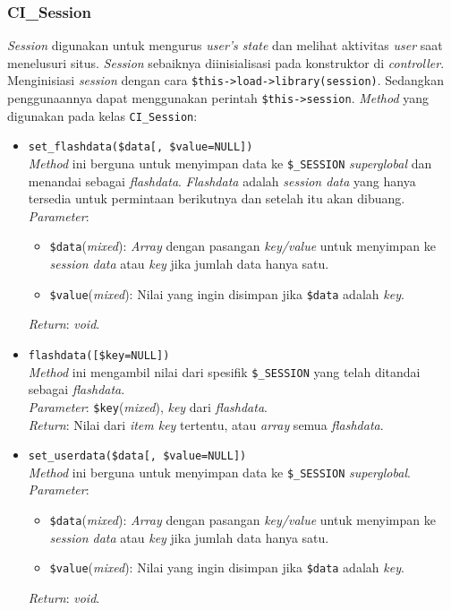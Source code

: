 \subsubsection{CI\_Session}
\textit{Session} digunakan untuk mengurus  \textit{user's state} dan melihat aktivitas \textit{user} saat menelusuri situs. \textit{Session} sebaiknya diinisialisasi pada konstruktor di \textit{controller}. Menginisiasi \textit{session} dengan cara \texttt{\$this->load->library(\textquotesingle session\textquotesingle)}. Sedangkan penggunaannya dapat menggunakan perintah \texttt{\$this->session}. \textit{Method} yang digunakan pada kelas \texttt{CI\_Session}:

\begin{itemize}
	\item \texttt{set\_flashdata(\$data[, \$value=NULL])}	\\
	\textit{Method} ini berguna untuk menyimpan data ke \texttt{\$\_SESSION} \textit{superglobal} dan menandai sebagai \textit{flashdata}. \textit{Flashdata} adalah \textit{session data} yang hanya tersedia untuk permintaan berikutnya dan setelah itu akan dibuang.\\
	 \textit{Parameter}: 
	 \begin{itemize}
	 	\item \texttt{\$data}(\textit{mixed}): \textit{Array} dengan pasangan \textit{key/value} untuk menyimpan ke \textit{session data} atau \textit{key} jika jumlah data hanya satu. 
	 	\item \texttt{\$value}(\textit{mixed}): Nilai yang ingin disimpan jika \texttt{\$data} adalah \textit{key}.
	 \end{itemize}
	 \textit{Return}: \textit{void}.
	 
	 \item \texttt{flashdata([\$key=NULL])} \\
	 \textit{Method} ini mengambil nilai dari spesifik \texttt{\$\_SESSION} yang telah ditandai sebagai \textit{flashdata}. \\
	 \textit{Parameter}: \texttt{\$key}(\textit{mixed}), \textit{key} dari \textit{flashdata}. \\
	 \textit{Return}: Nilai dari \textit{item key} tertentu, atau \textit{array} semua \textit{flashdata}.
	
	\item \texttt{set\_userdata(\$data[, \$value=NULL])} \\
	\textit{Method} ini berguna untuk menyimpan data ke \texttt{\$\_SESSION} \textit{superglobal}. \\
	\textit{Parameter}: 
	\begin{itemize}
		\item \texttt{\$data}(\textit{mixed}): \textit{Array} dengan pasangan \textit{key/value} untuk menyimpan ke \textit{session data} atau \textit{key} jika jumlah data hanya satu.
		\item \texttt{\$value}(\textit{mixed}): Nilai yang ingin disimpan jika \texttt{\$data} adalah \textit{key}.
	\end{itemize}
	\textit{Return}: \textit{void}.
	

\end{itemize}
